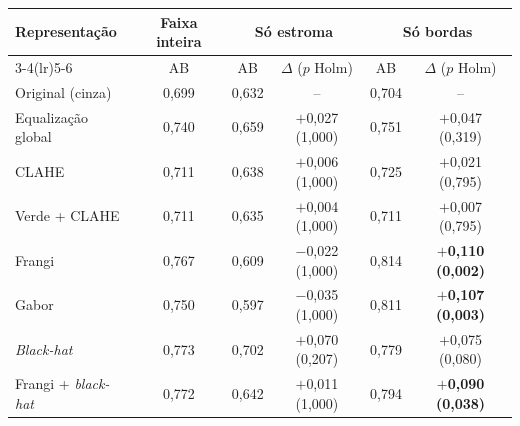 \begin{tabular}{lccccc}
\toprule
\multirow{2}{*}{Representação} & Faixa inteira & \multicolumn{2}{c}{Só estroma} & \multicolumn{2}{c}{Só bordas} \\
\cmidrule(lr){3-4}\cmidrule(lr){5-6}
 & AB & AB & $\Delta$ ($p$ Holm) & AB & $\Delta$ ($p$ Holm) \\
\midrule
Original (cinza) & 0,699 & 0,632 & -- & 0,704 & -- \\
Equalização global & 0,740 & 0,659 & $+$0,027 (1,000) & 0,751 & $+$0,047 (0,319) \\
CLAHE & 0,711 & 0,638 & $+$0,006 (1,000) & 0,725 & $+$0,021 (0,795) \\
Verde + CLAHE & 0,711 & 0,635 & $+$0,004 (1,000) & 0,711 & $+$0,007 (0,795) \\
\midrule
Frangi & 0,767 & 0,609 & $-$0,022 (1,000) & 0,814 & \textbf{$+$0,110 (0,002)} \\
Gabor & 0,750 & 0,597 & $-$0,035 (1,000) & 0,811 & \textbf{$+$0,107 (0,003)} \\
\textit{Black-hat} & 0,773 & 0,702 & $+$0,070 (0,207) & 0,779 & $+$0,075 (0,080) \\
Frangi + \textit{black-hat} & 0,772 & 0,642 & $+$0,011 (1,000) & 0,794 & \textbf{$+$0,090 (0,038)} \\
\bottomrule
\end{tabular}
